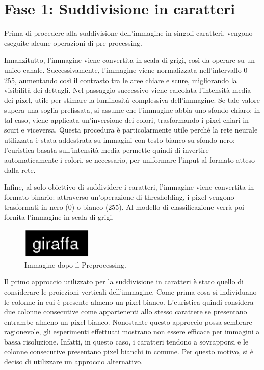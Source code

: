 \section{Fase 1: Suddivisione in caratteri}

Prima di procedere alla suddivisione dell'immagine in singoli caratteri, vengono eseguite alcune operazioni di pre-processing. 

Innanzitutto, l'immagine viene convertita in scala di grigi, così da operare su un unico canale. Successivamente, l'immagine viene normalizzata nell'intervallo 0-255, aumentando così il contrasto tra le aree chiare e scure, migliorando la visibilità dei dettagli. Nel passaggio successivo viene calcolata l'intensità media dei pixel, utile per stimare la luminosità complessiva dell'immagine. Se tale valore supera una soglia prefissata, si assume che l'immagine abbia uno sfondo chiaro; in tal caso, viene applicata un'inversione dei colori, trasformando i pixel chiari in scuri e viceversa. Questa procedura è particolarmente utile perché la rete neurale utilizzata è stata addestrata su immagini con testo bianco su sfondo nero; l'euristica basata sull'intensità media permette quindi di invertire automaticamente i colori, se necessario, per uniformare l'input al formato atteso dalla rete.

Infine, al solo obiettivo di suddividere i caratteri, l'immagine viene convertita in formato binario: attraverso un'operazione di thresholding, i pixel vengono trasformati in nero (0) o bianco (255). Al modello di classificazione verrà poi fornita l'immagine in scala di grigi.
\newline

\begin{figure}[H]
	\centering
	\includegraphics[width=0.3\textwidth]{images/giraffa-bin.png}
	\caption{Immagine dopo il Preprocessing.}
	\label{fig:giraffabin}
\end{figure}

Il primo approccio utilizzato per la suddivisione in caratteri è stato quello di considerare le proiezioni verticali dell'immagine. Come prima cosa si individuano le colonne in cui è presente almeno un pixel bianco.
L'euristica quindi considera due colonne consecutive come appartenenti allo stesso carattere se presentano entrambe almeno un pixel bianco. Nonostante questo approccio possa sembrare ragionevole, gli esperimenti effettuati mostrano non essere efficace per immagini a bassa risoluzione. Infatti, in questo caso, i caratteri tendono a sovrapporsi e le colonne consecutive presentano pixel bianchi in comune. Per questo motivo, si è deciso di utilizzare un approccio alternativo.
\newline

